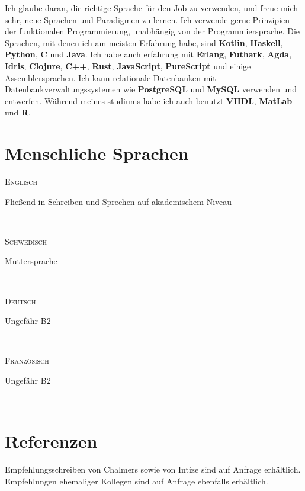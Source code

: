 \documentclass[letterpaper,
		10pt]{article}
\newcommand{\entry}[4]{
\ifthenelse{\isempty{#3}}
{\slimentry{#1}{#2}}{

\begin{minipage}[t]{.15\linewidth}
\hfill \textsc{#1}
\end{minipage}
\hfill\vline\hfill
\begin{minipage}[t]{.80\linewidth}
{\bf#2}\\\textit{#3} \small{#4}
\end{minipage}\\
\vspace{.2cm}
}}
\newcommand{\slimentry}[2]{
\begin{minipage}[t]{.15\linewidth}
\hfill \textsc{#1}
\end{minipage}
\hfill\vline\hfill
\begin{minipage}[t]{.80\linewidth}
#2
\end{minipage}\\
\vspace{.25cm}
}
\newcommand{\sentry}[2]{
\begin{minipage}[t]{.15\linewidth}
\hfill \textsc{#1}
\end{minipage}
\hfill\vline\hfill
\begin{minipage}[t]{.80\linewidth}
#2
\end{minipage}\\
\vspace{-.15cm}
}%
\begin{document}
Ich glaube daran, die richtige Sprache für den Job zu verwenden, und freue mich sehr, neue Sprachen und Paradigmen zu lernen. Ich verwende gerne Prinzipien der funktionalen Programmierung, unabhängig von der Programmiersprache. Die Sprachen, mit denen ich am meisten Erfahrung habe, sind \textbf{Kotlin}, \textbf{Haskell}, \textbf{Python}, \textbf{C} und \textbf{Java}. Ich habe auch erfahrung mit
\textbf{Erlang}, \textbf{Futhark}, \textbf{Agda}, \textbf{Idris}, \textbf{Clojure}, \textbf{C++},
\textbf{Rust}, \textbf{JavaScript}, \textbf{PureScript} und einige Assemblersprachen.
Ich kann relationale Datenbanken mit Datenbankverwaltungssystemen wie \textbf{PostgreSQL}
und \textbf{MySQL} verwenden und entwerfen.
Während meines studiums habe ich auch benutzt \textbf{VHDL}, \textbf{MatLab} und \textbf{R}.

\section{Menschliche Sprachen}

\sentry{Englisch}{Fließend in Schreiben und Sprechen auf akademischem Niveau}

\sentry{Schwedisch}{Muttersprache}

\sentry{Deutsch}{Ungefähr B2}

\sentry{Französisch}{Ungefähr B2}


\section{Referenzen}
    
Empfehlungsschreiben von Chalmers sowie von Intize sind auf Anfrage erhältlich. Empfehlungen ehemaliger Kollegen sind auf Anfrage ebenfalls erhältlich.
\end{document}
